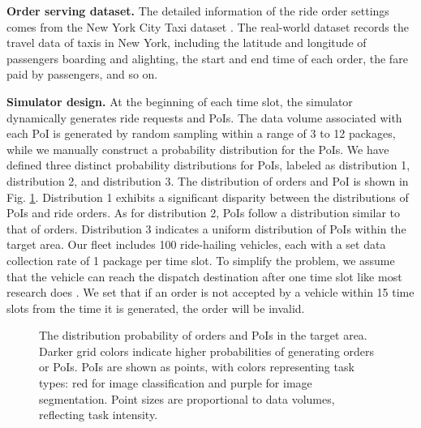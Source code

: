 
\noindent\textbf{Order serving dataset.}
The detailed information of the ride order settings comes from the New York City Taxi dataset \cite{newyork_taxi}. The real-world dataset records the travel data of taxis in New York, including the latitude and longitude of passengers boarding and alighting, the start and end time of each order, the fare paid by passengers, and so on. 

\noindent\textbf{Simulator design.}
At the beginning of each time slot, the simulator dynamically generates ride requests and PoIs. The data volume associated with each PoI is generated by random sampling within a range of 3 to 12 packages, while we manually construct a probability distribution for the PoIs. We have defined three distinct probability distributions for PoIs, labeled as distribution 1, distribution 2, and distribution 3. The distribution of orders and PoI is shown in Fig. \ref{fig: dis of order and poi}. Distribution 1 exhibits a significant disparity between the distributions of PoIs and ride orders. As for distribution 2, PoIs follow a distribution similar to that of orders. Distribution 3 indicates a uniform distribution of PoIs within the target area. Our fleet includes 100 ride-hailing vehicles, each with a set data collection rate of 1 package per time slot. To simplify the problem, we assume that the vehicle can reach the dispatch destination after one time slot like most research does \cite{KDD18, assume_cost_one_time_slot_to_reach_dispatched_destination}. We set that if an order is not accepted by a vehicle within 15 time slots from the time it is generated, the order will be invalid. 
\begin{figure}[t]
\centering  %
\hfil
{} 

\hfil
{} 

\caption{
The distribution probability of orders and PoIs in the target area. Darker grid colors indicate higher probabilities of generating orders or PoIs. PoIs are shown as points, with colors representing task types: red for image classification and purple for image segmentation. Point sizes are proportional to data volumes, reflecting task intensity.}
\label{fig: dis of order and poi}
\end{figure}

